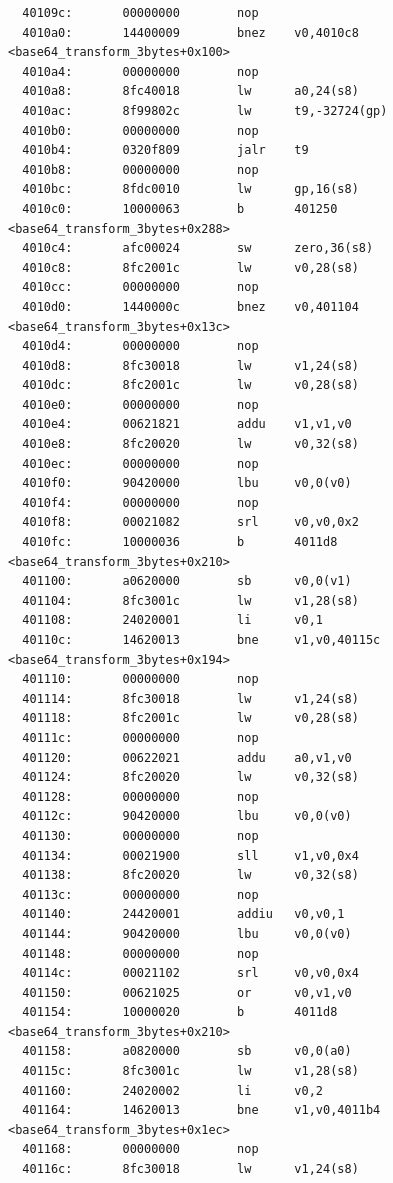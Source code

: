 \documentclass[11pt]{article}
\begin{document}
\begin{verbatim}
  40109c:       00000000        nop
  4010a0:       14400009        bnez    v0,4010c8 <base64_transform_3bytes+0x100>
  4010a4:       00000000        nop
  4010a8:       8fc40018        lw      a0,24(s8)
  4010ac:       8f99802c        lw      t9,-32724(gp)
  4010b0:       00000000        nop
  4010b4:       0320f809        jalr    t9
  4010b8:       00000000        nop
  4010bc:       8fdc0010        lw      gp,16(s8)
  4010c0:       10000063        b       401250 <base64_transform_3bytes+0x288>
  4010c4:       afc00024        sw      zero,36(s8)
  4010c8:       8fc2001c        lw      v0,28(s8)
  4010cc:       00000000        nop
  4010d0:       1440000c        bnez    v0,401104 <base64_transform_3bytes+0x13c>
  4010d4:       00000000        nop
  4010d8:       8fc30018        lw      v1,24(s8)
  4010dc:       8fc2001c        lw      v0,28(s8)
  4010e0:       00000000        nop
  4010e4:       00621821        addu    v1,v1,v0
  4010e8:       8fc20020        lw      v0,32(s8)
  4010ec:       00000000        nop
  4010f0:       90420000        lbu     v0,0(v0)
  4010f4:       00000000        nop
  4010f8:       00021082        srl     v0,v0,0x2
  4010fc:       10000036        b       4011d8 <base64_transform_3bytes+0x210>
  401100:       a0620000        sb      v0,0(v1)
  401104:       8fc3001c        lw      v1,28(s8)
  401108:       24020001        li      v0,1
  40110c:       14620013        bne     v1,v0,40115c <base64_transform_3bytes+0x194>
  401110:       00000000        nop
  401114:       8fc30018        lw      v1,24(s8)
  401118:       8fc2001c        lw      v0,28(s8)
  40111c:       00000000        nop
  401120:       00622021        addu    a0,v1,v0
  401124:       8fc20020        lw      v0,32(s8)
  401128:       00000000        nop
  40112c:       90420000        lbu     v0,0(v0)
  401130:       00000000        nop
  401134:       00021900        sll     v1,v0,0x4
  401138:       8fc20020        lw      v0,32(s8)
  40113c:       00000000        nop
  401140:       24420001        addiu   v0,v0,1
  401144:       90420000        lbu     v0,0(v0)
  401148:       00000000        nop
  40114c:       00021102        srl     v0,v0,0x4
  401150:       00621025        or      v0,v1,v0
  401154:       10000020        b       4011d8 <base64_transform_3bytes+0x210>
  401158:       a0820000        sb      v0,0(a0)
  40115c:       8fc3001c        lw      v1,28(s8)
  401160:       24020002        li      v0,2
  401164:       14620013        bne     v1,v0,4011b4 <base64_transform_3bytes+0x1ec>
  401168:       00000000        nop
  40116c:       8fc30018        lw      v1,24(s8)

\end{verbatim}
\end{document}
